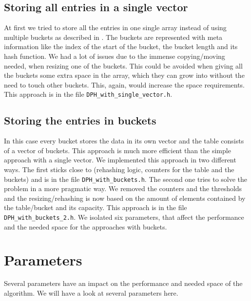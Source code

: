 \documentclass{article}
\begin{document}
\subsection{Storing all entries in a single vector}

At first we tried to store all the entries in one single array instead of using multiple buckets as described in \cite[p. 94]{mesa08}. The buckets are represented with meta information like the index of the start of the bucket, the bucket length and its hash function. We had a lot of issues due to the immense copying/moving needed, when resizing one of the buckets. This could be avoided when giving all the buckets some extra space in the array, which they can grow into without the need to touch other buckets. This, again, would increase the space requirements. This approach is in the file \texttt{DPH\_with\_single\_vector.h}.

\subsection{Storing the entries in buckets}

In this case every bucket stores the data in its own vector and the table consists of a vector of buckets. This approach is much more efficient than the simple approach with a single vector. We implemented this approach in two different ways. The first sticks close to \cite{di94} (rehashing logic, counters for the table and the buckets) and is in the file \texttt{DPH\_with\_buckets.h}. The second one tries to solve the problem in a more pragmatic way. We removed the counters and the thresholds and the resizing/rehashing is now based on the amount of elements contained by the table/bucket and its capacity. This approach is in the file \texttt{DPH\_with\_buckets\_2.h}. We isolated six parameters, that affect the performance and the needed space for the approaches with buckets.

\section{Parameters}

Several parameters have an impact on the performance and needed space of the
algorithm. We will have a look at several parameters here.
\end{document}
